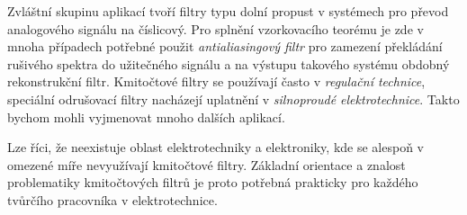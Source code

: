         Zvláštní skupinu aplikací tvoří filtry typu dolní propust v systémech pro převod analogového
        signálu na číslicový. Pro splnění vzorkovacího teorému je zde v mnoha případech potřebné
        použit \emph{antialiasingový filtr} pro zamezení překládání rušivého spektra do užitečného
        signálu a na výstupu takového systému obdobný rekonstrukční filtr. Kmitočtové filtry se
        používají často v \emph{regulační technice}, speciální odrušovací filtry nacházejí uplatnění
        v \emph{silnoproudé elektrotechnice}. Takto bychom mohli vyjmenovat mnoho dalších aplikací.

        Lze říci, že neexistuje oblast elektrotechniky a elektroniky, kde se alespoň v omezené míře
        nevyužívají kmitočtové filtry. Základní orientace a znalost problematiky kmitočtových filtrů
        je proto potřebná prakticky pro každého tvůrčího pracovníka v elektrotechnice.
    
